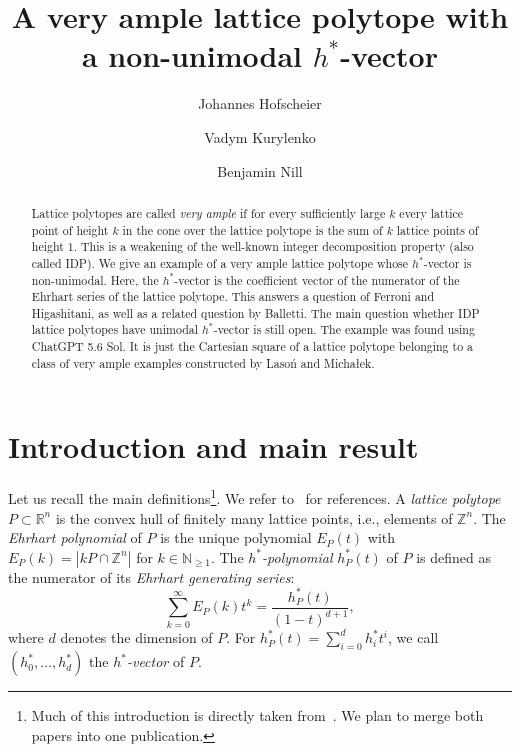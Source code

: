 \documentclass[11pt]{amsart}
\title[A very ample lattice polytope with a non-unimodal $h^*$-vector]{A very ample lattice polytope with a non-unimodal $h^*$-vector}
\author[J.~Hofscheier]{Johannes Hofscheier}
\author[V.~Kurylenko]{Vadym Kurylenko}
\author[B.~Nill]{Benjamin Nill}
\theoremstyle{definition}
\newcommand{\R}{\mathbb{R}}
\newcommand{\Z}{\mathbb{Z}}
\newcommand{\N}{{\mathbb{N}}}
\newcommand{\hs}{h^*}
\begin{document}
\setlength{\parindent}{0pt}
\begin{abstract}
    Lattice polytopes are called \emph{very ample} if for every sufficiently large $k$ every lattice point of height $k$ in the cone over the lattice polytope is the sum of $k$ lattice points of height $1$.
    This is a weakening of the well-known integer decomposition property (also called IDP).
    We give an example of a very ample lattice polytope whose $h^*$-vector is non-unimodal.
    Here, the $h^*$-vector is the coefficient vector of the numerator of the Ehrhart series of the lattice polytope.
    This answers a question of  Ferroni and Higashitani, as well as a related question by Balletti.
    The main question whether IDP lattice polytopes have unimodal $h^*$-vector is still open.
    The example was found using ChatGPT 5.6 Sol.
    It is just the Cartesian square of a lattice polytope belonging to a class of very ample examples constructed by Laso\'{n} and Micha\l ek. 
\end{abstract}

\maketitle

\thispagestyle{empty}

\section{Introduction and main result}

Let us recall the main definitions\footnote{Much of this introduction is directly taken from~\cite{IDP-paper}.
We plan to merge both papers into one publication.}.
We refer to~\cite{beckbook} for references.
A \emph{lattice polytope} $P \subset \R^n$ is the convex hull of finitely many lattice points, i.e., elements of $\Z^n$.
The \emph{Ehrhart polynomial} of $P$ is the unique polynomial $E_P(t)$ with $E_P(k) = |k P \cap \Z^n|$ for $k \in \N_{\ge 1}$.
The \emph{$\hs$-polynomial} $\hs_P(t)$ of $P$ is defined as the numerator of its \emph{Ehrhart generating series}: 
\[
    \sum_{k=0}^\infty E_P(k) t^k = \frac{\hs_P(t)}{(1-t)^{d+1}},
\]
where $d$ denotes the dimension of $P$.
For $\hs_P(t)=\sum_{i=0}^d \hs_i t^i$, we call $(\hs_0, \ldots, \hs_d)$ the {\em $\hs$-vector} of $P$. 

\smallskip
\end{document}
